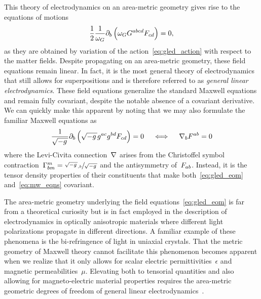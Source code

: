 This theory of electrodynamics on an area-metric geometry gives rise to the equations of motions
\begin{equation}\label{eq:gled_eom}
	\frac{1}{2}\frac{1}{\omega_G}\partial_b\left(\omega_GG^{abcd}F_{cd}\right)=0
	\mathpunct{,}
\end{equation}
as they are obtained by variation of the action~\eqref{eq:gled_action} with respect to the matter fields. Despite propagating on an area-metric geometry, these field equations remain linear. In fact, it is the most general theory of electrodynamics that still allows for superpositions and is therefore referred to as \emph{general linear electrodynamics}. These field equations generalize the standard Maxwell equations and remain fully covariant, despite the notable absence of a covariant derivative. We can quickly make this apparent by noting that we may also formulate the familiar Maxwell equations as
\begin{equation}\label{eq:mw_eqns}
	\frac{1}{\sqrt{-g\,}}\partial_b\left(\sqrt{-g\,}g^{ac}g^{bd}F_{cd}\right)=0 \quad \iff \quad \nabla_bF^{ab}=0
\end{equation}
where the Levi-Civita connection~$\nabla$ arises from the Christoffel symbol contraction~${\Gamma^{m}_{bm}}=\sfrac{\sqrt{-g\,}_{,b}}{\sqrt{-g\,}}$ and the antisymmetry of~$F_{ab}$. Instead, it is the tensor density properties of their constituents that make both~\eqref{eq:gled_eom} and~\eqref{eq:mw_eqns} covariant.

The area-metric geometry underlying the field equations~\eqref{eq:gled_eom} is far from a theoretical curiosity but is in fact employed in the description of electrodynamics in optically anisotropic materials where different light polarizations propagate in different directions. A familiar example of these phenomena is the bi-refringence of light in uniaxial crystals. That the metric geometry of Maxwell theory cannot facilitate this phenomenon becomes apparent when we realize that it only allows for scalar electric permittivities~$\epsilon$ and magnetic permeabilities~$\mu$. Elevating both to tensorial quantities and also allowing for magneto-electric material properties requires the area-metric geometric degrees of freedom of general linear electrodynamics~\autocite{Rubilar2002,LanLifED}. 

